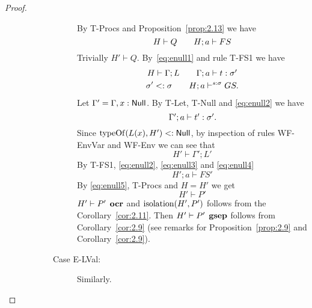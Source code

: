 \begin{proof}
\begin{description}
\begin{description}
\begin{description}
              By {\sc T-Procs} and Proposition~\ref{prop:2.13} we have 
              \begin{equation} \label{eq:enull1}
               H \vdash Q  \quad\quad H; a \vdash FS 
              \end{equation}
              Trivially $H' \vdash Q$. 
              By~\eqref{eq:enull1} and rule {\sc T-FS1} we have
              \begin{equation} \label{eq:enull2}
                \begin{gathered}
                  H \vdash \Gamma; L \quad\quad \mbox{$\Gamma;a\vdash t:\sigma'$} \\
                  \sigma' <: \sigma \quad\quad H; a \vdash^{s: \sigma} GS.
                \end{gathered}
              \end{equation}
              Let $\Gamma' = \Gamma, x: \mbox{$\mathsf{Null}$}$. By {\sc T-Let}, {\sc
              T-Null} and \eqref{eq:enull2} we have
              \begin{equation} \label{eq:enull3}
                \mbox{$\Gamma';a\vdash t':\sigma'$}.
              \end{equation}
              Since $\mbox{$\mathrm{typeOf}$}(L(x), H') <: \mbox{$\mathsf{Null}$}$, by inspection of rules
              {\sc WF-EnvVar} and {\sc WF-Env} we can see that
              \begin{equation} \label{eq:enull4}
                H' \vdash \Gamma';L'
              \end{equation}
              By {\sc T-FS1}, \eqref{eq:enull2}, \eqref{eq:enull3} and \eqref{eq:enull4}
              \begin{equation}\label{eq:enull5}
                H';a \vdash FS'
              \end{equation}
              By \eqref{eq:enull5}, {\sc T-Procs} and $H = H'$ we get  
              \begin{equation}
                H' \vdash P'
              \end{equation}
              $H' \vdash P' \:\: \mbox{\bf ocr}$ and $\mbox{$\mathrm{isolation}$}{(H', P')}$ follows from
              the Corollary~\ref{cor:2.11}. Then $H' \vdash P'
              \:\: \mbox{\bf gsep}$ follows from Corollary~\ref{cor:2.9} (see remarks
              for Proposition~\ref{prop:2.9} and Corollary~\ref{cor:2.9}).

            \item[Case {\sc E-LVal}:] Similarly.


\end{description}
\end{description}
\end{description}
\end{proof}
